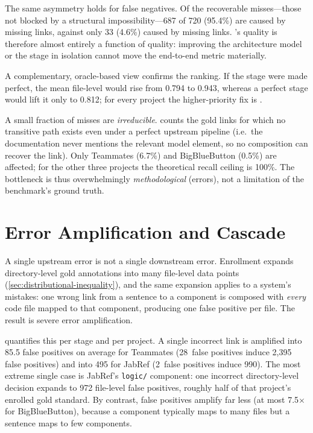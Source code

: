 

The same asymmetry holds for false negatives. Of the recoverable misses---those
not blocked by a structural impossibility---687 of 720 (95.4\%) are caused by
missing \sadsam links, against only 33 (4.6\%) caused by missing \samcode links.
\transarc's quality is therefore almost entirely a function of \sadsam quality:
improving the architecture model or the \samcode stage in isolation cannot move
the end-to-end metric materially.

A complementary, oracle-based view confirms the ranking. If the \sadsam stage
were made perfect, the mean file-level \fone would rise from 0.794 to 0.943,
whereas a perfect \samcode stage would lift it only to 0.812; for every project
the higher-priority fix is \sadsam.

A small fraction of misses are \emph{irreducible}. 
counts the gold \sadcode links for which no transitive path exists even under a
perfect upstream pipeline (i.e.\ the documentation never mentions the relevant
model element, so no composition can recover the link). Only Teammates (6.7\%)
and BigBlueButton (0.5\%) are affected; for the other three projects the
theoretical recall ceiling is 100\%. The bottleneck is thus overwhelmingly
\emph{methodological} (\sadsam errors), not a limitation of the benchmark's
ground truth.



\section{Error Amplification and Cascade}
\label{sec:transarc:amplification}

A single upstream error is not a single downstream error. Enrollment expands
directory-level gold annotations into many file-level data points
(\cref{sec:distributional-inequality}), and the same expansion applies to a
system's mistakes: one wrong \sadsam link from a sentence to a component is
composed with \emph{every} code file mapped to that component, producing one
\transarc false positive per file. The result is severe error amplification.

 quantifies this per stage and per project. A
single incorrect \sadsam link is amplified into 85.5 \transarc false positives
on average for Teammates (28~\sadsam false positives induce 2{,}395 \transarc
false positives) and into 495 for JabRef (2~\sadsam false positives induce
990). The most extreme single case is JabRef's \texttt{logic/} component: one
incorrect directory-level decision expands to 972 file-level false positives,
roughly half of that project's enrolled gold standard. By contrast, \samcode
false positives amplify far less (at most 7.5$\times$ for BigBlueButton),
because a component typically maps to many files but a sentence maps to few
components.

